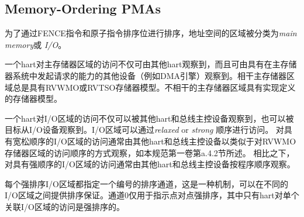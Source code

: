 {\subsection{Memory-Ordering PMAs}

\iffalse
Regions of the address space are classified as either {\em main
  memory} or {\em I/O} for the purposes of ordering by the FENCE
instruction and atomic-instruction ordering bits.
\fi
为了通过FENCE指令和原子指令排序位进行排序，地址空间的区域被分类为{\em main
memory}或 {\em I/O}。

\iffalse
Accesses by one hart to main memory regions are observable not only by
other harts but also by other devices with the capability to initiate
requests in the main memory system (e.g., DMA engines).
Coherent main memory regions always have either the RVWMO or RVTSO memory
model.
Incoherent main memory regions have an implementation-defined memory model.
\fi
一个hart对主存储器区域的访问不仅可由其他hart观察到，而且可由具有在主存储器系统中发起请求的能力的其他设备（例如DMA引擎）观察到。相干主存储器区域总是具有RVWMO或RVTSO存储器模型。不相干的主存储器区域具有实现定义的存储器模型。

\iffalse
Accesses by one hart to an I/O region are observable not only by other harts
and bus mastering devices but also by targeted slave I/O devices, and I/O
regions may be accessed with either {\em relaxed} or {\em strong} ordering.
Accesses to an I/O region with relaxed ordering are generally observed by
other harts and bus mastering devices in a manner similar to the ordering of
accesses to an RVWMO memory region, as discussed in Section A.4.2 in Volume
I of this specification.
By contrast, accesses to an I/O region with strong ordering are generally
observed by other harts and bus mastering devices in program order.
\fi
一个hart对I/O区域的访问不仅可以被其他hart和总线主控设备观察到，也可以被目标从I/O设备观察到。I/O区域可以通过{\em relaxed} or {\em strong} 顺序进行访问。
对具有宽松顺序的I/O区域的访问通常由其他hart和总线主控设备以类似于对RVWMO存储器区域的访问顺序的方式观察，如本规范第一卷第a.4.2节所述。
相比之下，对具有强顺序的I/O区域的访问通常由其他hart和总线主控设备按程序顺序观察。

\iffalse
Each strongly ordered I/O region specifies a numbered ordering
channel, which is a mechanism by which ordering guarantees can be
provided between different I/O regions.  Channel 0 is used to indicate
point-to-point strong ordering only, where only accesses by the hart to the
single associated I/O region are strongly ordered.
\fi
每个强排序I/O区域都指定一个编号的排序通道，这是一种机制，可以在不同的I/O区域之间提供排序保证。通道0仅用于指示点对点强排序，其中只有hart对单个关联I/O区域的访问是强排序的。

}
